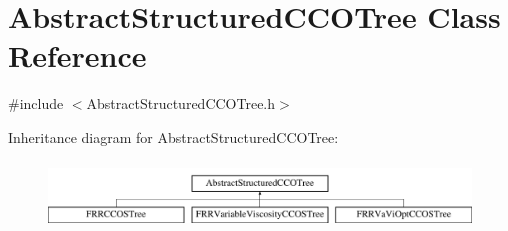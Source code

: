 \hypertarget{class_abstract_structured_c_c_o_tree}{}\section{Abstract\+Structured\+C\+C\+O\+Tree Class Reference}
\label{class_abstract_structured_c_c_o_tree}


{\ttfamily \#include $<$Abstract\+Structured\+C\+C\+O\+Tree.\+h$>$}

Inheritance diagram for Abstract\+Structured\+C\+C\+O\+Tree\+:\begin{figure}[H]
\begin{center}
\leavevmode
\includegraphics[height=1.821138cm]{df/dae/class_abstract_structured_c_c_o_tree}
\end{center}
\end{figure}

